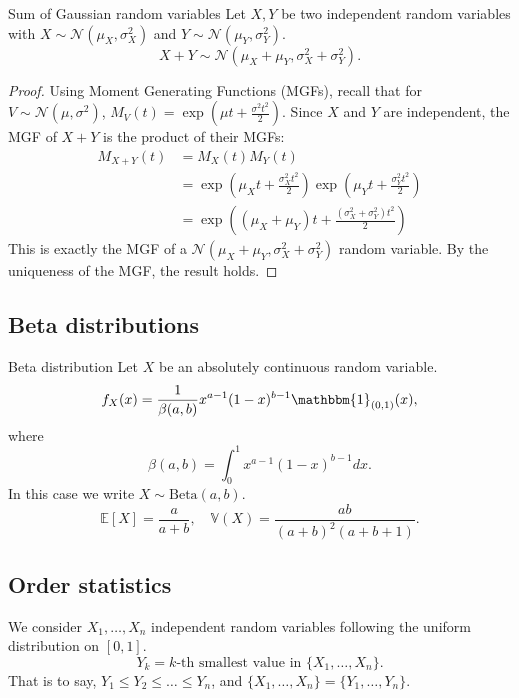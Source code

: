 \documentclass[11pt, a4paper]{article}
\begin{document}
\begin{proposition}{Sum of Gaussian random variables}{} %
Let $X, Y$ be two independent random variables with $X \sim \mathcal{N}(\mu_X, \sigma_X^2)$ and $Y \sim \mathcal{N}(\mu_Y, \sigma_Y^2)$. %
\[ X + Y \sim \mathcal{N}(\mu_X + \mu_Y, \sigma_X^2 + \sigma_Y^2). \] %
\end{proposition}

\begin{proof}
Using Moment Generating Functions (MGFs), recall that for $V \sim \mathcal{N}(\mu, \sigma^2)$, $M_V(t) = \exp\left(\mu t + \frac{\sigma^2 t^2}{2}\right)$.
Since $X$ and $Y$ are independent, the MGF of $X+Y$ is the product of their MGFs:
\begin{align*}
    M_{X+Y}(t) &= M_X(t) M_Y(t) \\
    &= \exp\left(\mu_X t + \frac{\sigma_X^2 t^2}{2}\right) \exp\left(\mu_Y t + \frac{\sigma_Y^2 t^2}{2}\right) \\
    &= \exp\left((\mu_X + \mu_Y)t + \frac{(\sigma_X^2 + \sigma_Y^2)t^2}{2}\right)
\end{align*}
This is exactly the MGF of a $\mathcal{N}(\mu_X + \mu_Y, \sigma_X^2 + \sigma_Y^2)$ random variable. By the uniqueness of the MGF, the result holds.
\end{proof}

\subsection{Beta distributions} %

\begin{definition}{Beta distribution}{} %
Let $X$ be an absolutely continuous random variable. %
\[ f_X(x) = \frac{1}{\beta(a,b)} x^{a-1} (1-x)^{b-1} \mathbbm{1}_{(0,1)}(x), \] %
where %
\[ \beta(a,b) = \int_0^1 x^{a-1} (1-x)^{b-1} dx. \] %
In this case we write $X \sim \text{Beta}(a,b)$. %
\[ \mathbb{E}[X] = \frac{a}{a+b}, \quad \mathbb{V}(X) = \frac{ab}{(a+b)^2(a+b+1)}. \] %
\end{definition}

\subsection{Order statistics} %

We consider $X_1, \dots, X_n$ independent random variables following the uniform distribution on $[0,1]$. %
\[ Y_k = \text{$k$-th smallest value in } \{X_1, \dots, X_n\}. \] %
That is to say, $Y_1 \le Y_2 \le \dots \le Y_n$, and $\{X_1, \dots, X_n\} = \{Y_1, \dots, Y_n\}$. %
\end{document}
